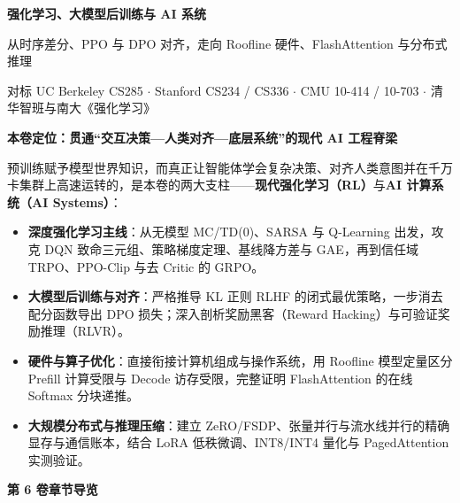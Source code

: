 \documentclass[UTF8,10.5pt,a4paper,oneside,fontset=fandol,scheme=plain]{ctexbook}
\begin{document}
{\fontsize{25}{33}\selectfont\sffamily\bfseries\color{ink}强化学习、大模型后训练与 AI 系统}\par
\vspace{2.5mm}
{\large\sffamily\color{teal}从时序差分、PPO 与 DPO 对齐，走向 Roofline 硬件、FlashAttention 与分布式推理}\par
\vspace{4.5mm}
{\small\color{slate}对标 UC Berkeley CS285 $\cdot$ Stanford CS234 / CS336 $\cdot$ CMU 10-414 / 10-703 $\cdot$ 清华智班与南大《强化学习》}\par

\vspace{5.5mm}

\begin{tcolorbox}[
  enhanced,
  colback=tealLight,
  colframe=tealLine,
  borderline west={2.6pt}{0pt}{tealDark},
  arc=2mm,
  boxrule=0.5pt,
  left=4.5mm,right=4.5mm,top=3mm,bottom=3mm
]
\textbf{\sffamily\color{tealDark}本卷定位：贯通“交互决策—人类对齐—底层系统”的现代 AI 工程脊梁}\par\vspace{1.2mm}
\small
预训练赋予模型世界知识，而真正让智能体学会复杂决策、对齐人类意图并在千万卡集群上高速运转的，是本卷的两大支柱——\textbf{现代强化学习（RL）}与\textbf{AI 计算系统（AI Systems）}：
\begin{itemize}
  \item \textbf{深度强化学习主线}：从无模型 MC/TD(0)、SARSA 与 Q-Learning 出发，攻克 DQN 致命三元组、策略梯度定理、基线降方差与 GAE，再到信任域 TRPO、PPO-Clip 与去 Critic 的 GRPO。
  \item \textbf{大模型后训练与对齐}：严格推导 KL 正则 RLHF 的闭式最优策略，一步消去配分函数导出 DPO 损失；深入剖析奖励黑客（Reward Hacking）与可验证奖励推理（RLVR）。
  \item \textbf{硬件与算子优化}：直接衔接计算机组成与操作系统，用 Roofline 模型定量区分 Prefill 计算受限与 Decode 访存受限，完整证明 FlashAttention 的在线 Softmax 分块递推。
  \item \textbf{大规模分布式与推理压缩}：建立 ZeRO/FSDP、张量并行与流水线并行的精确显存与通信账本，结合 LoRA 低秩微调、INT8/INT4 量化与 PagedAttention 实测验证。
\end{itemize}
\end{tcolorbox}

\vspace{4.5mm}

\noindent\textbf{\sffamily\color{tealDark}第 6 卷章节导览}
\vspace{1.5mm}
\end{document}
